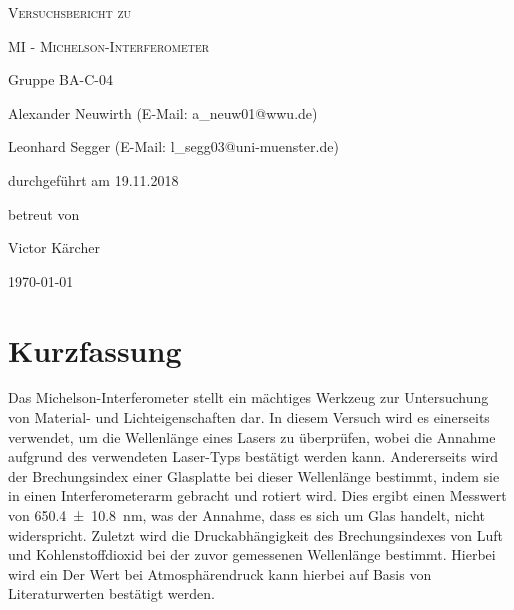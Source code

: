 \documentclass[
	a4paper,
	12pt,
	pagesize,
	ngerman
]{scrartcl}
\begin{document}
	\begin{titlepage}
		\centering
		{\scshape\LARGE Versuchsbericht zu \par}
		\vspace{1cm}
		{\scshape\huge MI - Michelson-Interferometer \par} %
		\vspace{2.5cm}
		{\LARGE Gruppe BA-C-04 \par}
		\vspace{0.5cm}

		{\large Alexander Neuwirth (E-Mail: a\_neuw01@wwu.de) \par}
		{\large Leonhard Segger (E-Mail: l\_segg03@uni-muenster.de) \par}
		\vfill

		durchgeführt am 19.11.2018\par
		betreut von\par
		{\large Victor Kärcher} %

		\vfill

		{\large \today\par}
	\end{titlepage}
	\tableofcontents
	\newpage


	\section{Kurzfassung}
	Das Michelson-Interferometer stellt ein mächtiges Werkzeug zur Untersuchung von Material- und Lichteigenschaften dar.
	In diesem Versuch wird es einerseits verwendet, um die Wellenlänge eines Lasers zu überprüfen, wobei die Annahme aufgrund des verwendeten Laser-Typs bestätigt werden kann.
	Andererseits wird der Brechungsindex einer Glasplatte bei dieser Wellenlänge bestimmt, indem sie in einen Interferometerarm gebracht und rotiert wird.
	Dies ergibt einen Messwert von \SI{650,4+-10,8}{nm}, was der Annahme, dass es sich um Glas handelt, nicht widerspricht. %
	Zuletzt wird die Druckabhängigkeit des Brechungsindexes von Luft und Kohlenstoffdioxid bei der zuvor gemessenen Wellenlänge bestimmt.
	Hierbei wird ein %
	Der Wert bei Atmosphärendruck kann hierbei auf Basis von Literaturwerten bestätigt werden.
\end{document}
